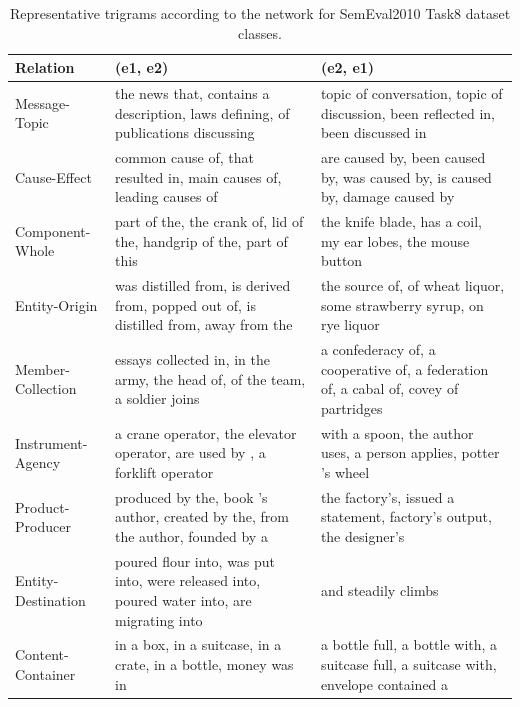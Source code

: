 \begin{table}
  \begin{center}
 \begin{tabular}{ | p{2cm} | p{5cm} |  p{5cm} | }
    \hline
    Relation & (e1, e2) & (e2, e1) \\ \hline
     Message-Topic & the news that, contains a description, laws defining, of publications discussing & topic of conversation, topic of discussion, been reflected in, been discussed in \\ \hline
     Cause-Effect & common cause of, that resulted in, main causes of, leading causes of & are caused by, been caused by, was caused by, is caused by, damage caused by \\ \hline
     Component-Whole & part of the, the crank of, lid of the, handgrip of the, part of this & the knife blade, has a coil, my ear lobes, the mouse button \\ \hline
     Entity-Origin & was distilled from, is derived from, popped out of, is distilled from, away from the & the source of, of wheat liquor, some strawberry syrup, on rye liquor \\ \hline
     Member-Collection & essays collected in, in the army, the head of, of the team, a soldier joins & a confederacy of, a cooperative of, a federation of, a cabal of, covey of partridges \\ \hline
     Instrument-Agency & a crane operator, the elevator operator, are used by , a forklift operator & with a spoon, the author uses, a person applies, potter 's wheel \\ \hline
     Product-Producer & produced by the, book 's author, created by the, from the author, founded by a & the factory's, issued a statement, factory's output, the designer's \\ \hline
     Entity-Destination & poured flour into, was put into, were released into, poured water into, are migrating into & and steadily climbs \\ \hline
     Content-Container & in a box, in a suitcase, in a crate, in a bottle, money was in & a bottle full, a bottle with, a suitcase full, a suitcase with, envelope contained a \\ \hline
    \end{tabular}
\caption[Representative trigrams, SemEval dataset]{Representative trigrams according to the network for SemEval2010 Task8 dataset classes.}
\label{tab:repr-trigr}
\end{center}
\end{table}

